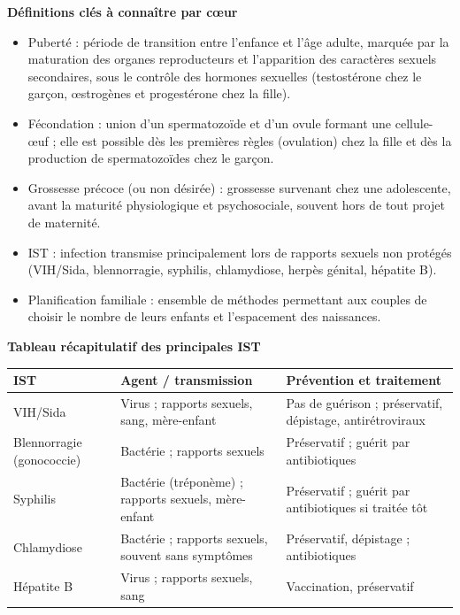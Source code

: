 \documentclass[11pt]{article}
\newcommand{\cle}[1]{{\popxbold\color{popdark}#1}}
\begin{document}
\begin{bilan}
\textbf{Définitions clés à connaître par cœur}
\begin{itemize}
  \item \cle{Puberté} : période de transition entre l'enfance et l'âge adulte, marquée par la maturation des organes reproducteurs et l'apparition des caractères sexuels secondaires, sous le contrôle des hormones sexuelles (testostérone chez le garçon, œstrogènes et progestérone chez la fille).
  \item \cle{Fécondation} : union d'un spermatozoïde et d'un ovule formant une cellule-œuf ; elle est possible dès les premières règles (ovulation) chez la fille et dès la production de spermatozoïdes chez le garçon.
  \item \cle{Grossesse précoce (ou non désirée)} : grossesse survenant chez une adolescente, avant la maturité physiologique et psychosociale, souvent hors de tout projet de maternité.
  \item \cle{IST} : infection transmise principalement lors de rapports sexuels non protégés (VIH/Sida, blennorragie, syphilis, chlamydiose, herpès génital, hépatite B).
  \item \cle{Planification familiale} : ensemble de méthodes permettant aux couples de choisir le nombre de leurs enfants et l'espacement des naissances.
\end{itemize}

\textbf{Tableau récapitulatif des principales IST}
\begin{center}
\begin{tabularx}{\linewidth}{|l|X|X|}
\hline
\rowcolor{popblueL} \textbf{IST} & \textbf{Agent / transmission} & \textbf{Prévention et traitement} \\
\hline
VIH/Sida & Virus ; rapports sexuels, sang, mère-enfant & Pas de guérison ; préservatif, dépistage, antirétroviraux \\
\hline
Blennorragie (gonococcie) & Bactérie ; rapports sexuels & Préservatif ; guérit par antibiotiques \\
\hline
Syphilis & Bactérie (tréponème) ; rapports sexuels, mère-enfant & Préservatif ; guérit par antibiotiques si traitée tôt \\
\hline
Chlamydiose & Bactérie ; rapports sexuels, souvent sans symptômes & Préservatif, dépistage ; antibiotiques \\
\hline
Hépatite B & Virus ; rapports sexuels, sang & Vaccination, préservatif \\
\hline
\end{tabularx}
\end{center}


\end{bilan}
\end{document}
